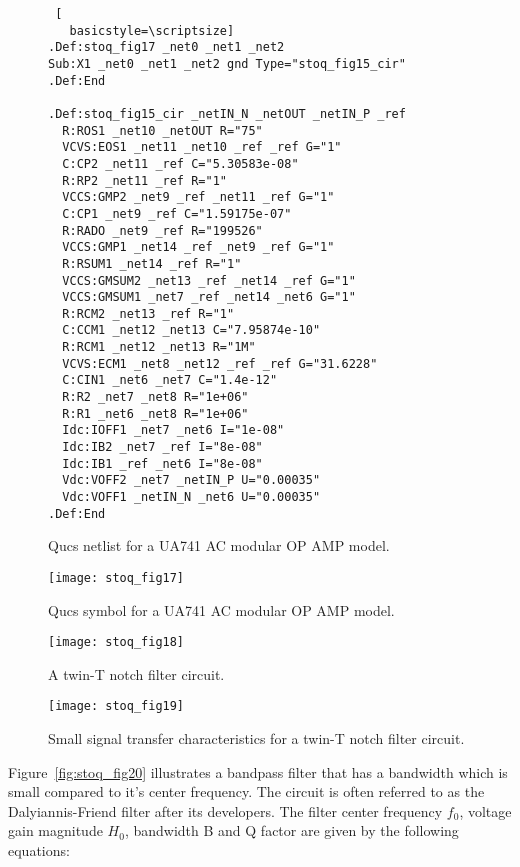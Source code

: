 \begin{figure}
 \begin{lstlisting} [
   basicstyle=\scriptsize]   
.Def:stoq_fig17 _net0 _net1 _net2
Sub:X1 _net0 _net1 _net2 gnd Type="stoq_fig15_cir"
.Def:End

.Def:stoq_fig15_cir _netIN_N _netOUT _netIN_P _ref
  R:ROS1 _net10 _netOUT R="75"
  VCVS:EOS1 _net11 _net10 _ref _ref G="1"
  C:CP2 _net11 _ref C="5.30583e-08"
  R:RP2 _net11 _ref R="1"
  VCCS:GMP2 _net9 _ref _net11 _ref G="1"
  C:CP1 _net9 _ref C="1.59175e-07"
  R:RADO _net9 _ref R="199526"
  VCCS:GMP1 _net14 _ref _net9 _ref G="1"
  R:RSUM1 _net14 _ref R="1"
  VCCS:GMSUM2 _net13 _ref _net14 _ref G="1"
  VCCS:GMSUM1 _net7 _ref _net14 _net6 G="1"
  R:RCM2 _net13 _ref R="1"
  C:CCM1 _net12 _net13 C="7.95874e-10"
  R:RCM1 _net12 _net13 R="1M"
  VCVS:ECM1 _net8 _net12 _ref _ref G="31.6228"
  C:CIN1 _net6 _net7 C="1.4e-12"
  R:R2 _net7 _net8 R="1e+06"
  R:R1 _net6 _net8 R="1e+06"
  Idc:IOFF1 _net7 _net6 I="1e-08"
  Idc:IB2 _net7 _ref I="8e-08"
  Idc:IB1 _ref _net6 I="8e-08"
  Vdc:VOFF2 _net7 _netIN_P U="0.00035"
  Vdc:VOFF1 _netIN_N _net6 U="0.00035"
.Def:End

\end{lstlisting} 
 \caption{Qucs netlist for a UA741 AC modular OP AMP model.}
\label{fig:stoq_fig16}
\end{figure}   

\begin{figure}
  \centering
  \texttt{[image: stoq\_fig17]}
  \caption{Qucs symbol for a UA741 AC modular OP AMP model.}
  \label{fig:stoq_fig17}
\end{figure} 

\begin{figure}
  \centering
  \texttt{[image: stoq\_fig18]}
  \caption{A twin-T notch filter circuit.}
  \label{fig:stoq_fig18}
\end{figure} 

\begin{figure}
  \centering
  \texttt{[image: stoq\_fig19]}
  \caption{Small signal transfer characteristics for a twin-T notch filter circuit.}
  \label{fig:stoq_fig19}
\end{figure} 

Figure~\ref{fig:stoq_fig20} illustrates a bandpass filter that has a bandwidth which is small compared to it's center frequency.  The circuit is often referred to as the Dalyiannis-Friend filter after its developers. The filter center frequency $f_{0}$, voltage gain magnitude $H_{0}$, bandwidth B and Q factor are given by the following equations:

